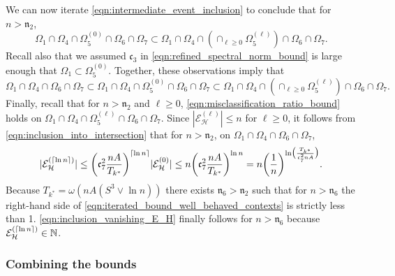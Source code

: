 \documentclass[11pt]{article}
\newcommand{\mf}[1]{\mathfrak{#1}}
\newcommand{\mcE}{\mathcal{E}}
\newcommand{\mcH}{\mathcal{H}}
\newcommand{\mbbN}{\mathbb{N}}
\DeclarePairedDelimiter\ceil{\lceil}{\rceil}
\theoremstyle{definition}
\theoremstyle{definition}
\begin{document}
We can now iterate \eqref{eqn:intermediate_event_inclusion} to conclude that for $n>\mf{n}_2$,
\begin{equation}
	\Omega_1\cap\Omega_4\cap \Omega_5^{(0)}\cap\Omega_6\cap\Omega_7
	\subset
	\Omega_1\cap\Omega_4\cap(\cap_{\ell\geq 0}\Omega_5^{(\ell)})\cap\Omega_6\cap\Omega_7
	.
\end{equation}
Recall also that we assumed $\mf{c}_3$ in \eqref{eqn:refined_spectral_norm_bound} is large enough that $\Omega_1\subset \Omega_5^{(0)}$.
Together, these observations imply that
\begin{equation}
	\label{eqn:inclusion_into_intersection}
	\Omega_1\cap\Omega_4\cap\Omega_6\cap\Omega_7
	\subset
	\Omega_1\cap\Omega_4\cap \Omega_5^{(0)}\cap\Omega_6\cap\Omega_7
	\subset
	\Omega_1\cap\Omega_4\cap(\cap_{\ell\geq 0}\Omega_5^{(\ell)})\cap\Omega_6\cap\Omega_7
	.
\end{equation}
Finally, recall that for $n>\mf{n}_2$ and $\ell\geq 0$, \eqref{eqn:misclassification_ratio_bound} holds on $\Omega_1\cap\Omega_4\cap\Omega_5^{(\ell)}\cap\Omega_6\cap\Omega_7$.
Since $|\mcE^{(\ell)}_{\mcH}|\leq n$ for $\ell\geq 0$, it follows from \eqref{eqn:inclusion_into_intersection} that for $n>\mf{n}_2$, on $\Omega_1\cap\Omega_4\cap\Omega_6\cap\Omega_7$,
\begin{equation}
	\label{eqn:iterated_bound_well_behaved_contexts}
	|\mcE^{(\ceil{\ln n})}_{\mcH}|
	\leq
	\biggl(\mf{c}_7^2\frac{nA}{T_{k^*}}\biggr)^{\ceil{\ln n}}|\mcE^{(0)}_{\mcH}|
	\leq
	n\biggl(\mf{c}_7^2\frac{nA}{T_{k^*}}\biggr)^{\ln n}
	=
	n\biggl(\frac{1}{n}\biggr)^{\ln\bigl(\frac{T_{k^*}}{\mf{c}_7^2nA}\bigr)}
	.
\end{equation}
Because $T_{k^*}=\omega(nA(S^3\vee \ln n))$ there exists $\mf{n}_6>\mf{n}_2$ such that for $n>\mf{n}_6$ the right-hand side of \eqref{eqn:iterated_bound_well_behaved_contexts} is strictly less than 1.
\eqref{eqn:inclusion_vanishing_E_H} finally follows for $n>\mf{n}_6$ because $\mcE^{(\ceil{\ln n})}_{\mcH}\in\mbbN$.

\subsubsection*{Combining the bounds}
\end{document}
